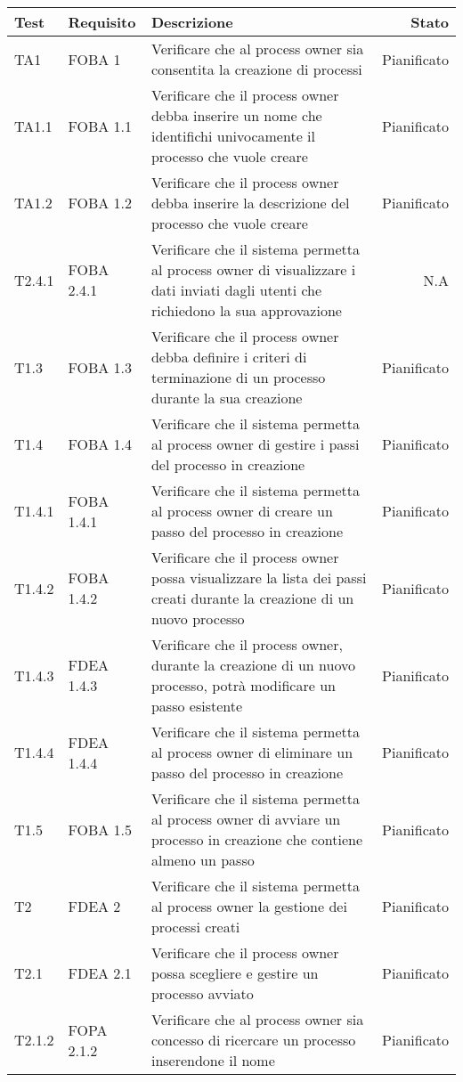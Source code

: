 \begin{longtable}{llXr}%
\toprule
\textbf{Test} & \textbf{Requisito} & \textbf{Descrizione} & \textbf{Stato}\\
\toprule
TA1&FOBA 1&Verificare che al process owner sia consentita la creazione di processi&Pianificato\\
\midrule
TA1.1&FOBA 1.1&Verificare che il process owner debba inserire un nome che identifichi univocamente il processo che vuole creare&Pianificato\\
\midrule
TA1.2&FOBA 1.2&Verificare che il process owner debba inserire la descrizione del processo che vuole creare &Pianificato\\
\midrule
T2.4.1&FOBA 2.4.1&Verificare che il sistema permetta al process owner di visualizzare i dati inviati dagli utenti che richiedono la sua approvazione&N.A\\
\midrule
T1.3&FOBA 1.3&Verificare che il process owner debba definire i criteri di terminazione di un processo durante la sua creazione&Pianificato\\
\midrule
T1.4&FOBA 1.4&Verificare che il sistema permetta al process owner di gestire i passi del processo in creazione&Pianificato\\
T1.4.1&FOBA 1.4.1&Verificare che il sistema permetta al process owner di creare un passo del processo in creazione&Pianificato\\
\midrule
T1.4.2&FOBA 1.4.2&Verificare che il process owner possa visualizzare la lista dei passi creati durante la creazione di un nuovo processo&Pianificato\\
\midrule
T1.4.3&FDEA 1.4.3&Verificare che il process owner, durante la creazione di un nuovo processo, potrà modificare un passo esistente&Pianificato\\
\midrule
T1.4.4&FDEA 1.4.4&Verificare che il sistema permetta al process owner di eliminare un passo del processo in creazione&Pianificato\\
\midrule
T1.5&FOBA 1.5&Verificare che il sistema permetta al process owner di avviare un processo in creazione che contiene almeno un passo&Pianificato\\
\midrule
T2&FDEA 2&Verificare che il sistema permetta al process owner la gestione dei processi creati&Pianificato\\
T2.1&FDEA 2.1&Verificare che il process owner possa scegliere e gestire un processo avviato&Pianificato\\
\midrule
T2.1.2&FOPA 2.1.2&Verificare che al process owner sia concesso di ricercare un processo inserendone il nome&Pianificato\\

\end{longtable}
